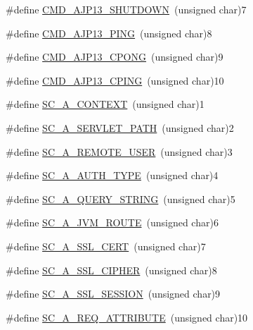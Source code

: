 \begin{DoxyCompactItemize}
\item 
\#define \hyperlink{group__AJP__defines_ga97fa035fc62acda65d55fa90f297bb1d}{C\+M\+D\+\_\+\+A\+J\+P13\+\_\+\+S\+H\+U\+T\+D\+O\+WN}~(unsigned char)7
\item 
\#define \hyperlink{group__AJP__defines_ga6c967e7bca128a8e6db0d30dd67173fe}{C\+M\+D\+\_\+\+A\+J\+P13\+\_\+\+P\+I\+NG}~(unsigned char)8
\item 
\#define \hyperlink{group__AJP__defines_ga51f3653bfe3e663583afce4668bd4cb0}{C\+M\+D\+\_\+\+A\+J\+P13\+\_\+\+C\+P\+O\+NG}~(unsigned char)9
\item 
\#define \hyperlink{group__AJP__defines_ga5275597c9b9ef1043095028ea6fdd211}{C\+M\+D\+\_\+\+A\+J\+P13\+\_\+\+C\+P\+I\+NG}~(unsigned char)10
\item 
\#define \hyperlink{group__AJP__defines_ga67528cf3789b4b222bd692e1d540663d}{S\+C\+\_\+\+A\+\_\+\+C\+O\+N\+T\+E\+XT}~(unsigned char)1
\item 
\#define \hyperlink{group__AJP__defines_ga6f5fa14a02fba2f3a372fa80816d2147}{S\+C\+\_\+\+A\+\_\+\+S\+E\+R\+V\+L\+E\+T\+\_\+\+P\+A\+TH}~(unsigned char)2
\item 
\#define \hyperlink{group__AJP__defines_ga35dcca779bb0d8464b059ba86175ab89}{S\+C\+\_\+\+A\+\_\+\+R\+E\+M\+O\+T\+E\+\_\+\+U\+S\+ER}~(unsigned char)3
\item 
\#define \hyperlink{group__AJP__defines_ga9dfa3a89c5a95b07a3196395bd3aecef}{S\+C\+\_\+\+A\+\_\+\+A\+U\+T\+H\+\_\+\+T\+Y\+PE}~(unsigned char)4
\item 
\#define \hyperlink{group__AJP__defines_ga5e1262359dbe3414d9b94d6da5dc3863}{S\+C\+\_\+\+A\+\_\+\+Q\+U\+E\+R\+Y\+\_\+\+S\+T\+R\+I\+NG}~(unsigned char)5
\item 
\#define \hyperlink{group__AJP__defines_ga22415300ecead8363d112aca8c21061b}{S\+C\+\_\+\+A\+\_\+\+J\+V\+M\+\_\+\+R\+O\+U\+TE}~(unsigned char)6
\item 
\#define \hyperlink{group__AJP__defines_ga4cd91021e08968ceb88cfd2b3a5d7ca0}{S\+C\+\_\+\+A\+\_\+\+S\+S\+L\+\_\+\+C\+E\+RT}~(unsigned char)7
\item 
\#define \hyperlink{group__AJP__defines_ga1e43fbbd5c0b735d39612243c3a1d5c8}{S\+C\+\_\+\+A\+\_\+\+S\+S\+L\+\_\+\+C\+I\+P\+H\+ER}~(unsigned char)8
\item 
\#define \hyperlink{group__AJP__defines_ga7c9686a2ecfa097c39ab27990b8f5ca5}{S\+C\+\_\+\+A\+\_\+\+S\+S\+L\+\_\+\+S\+E\+S\+S\+I\+ON}~(unsigned char)9
\item 
\#define \hyperlink{group__AJP__defines_ga593a0391ca4342a5e9afcef1dfc96fa0}{S\+C\+\_\+\+A\+\_\+\+R\+E\+Q\+\_\+\+A\+T\+T\+R\+I\+B\+U\+TE}~(unsigned char)10

\end{DoxyCompactItemize}
